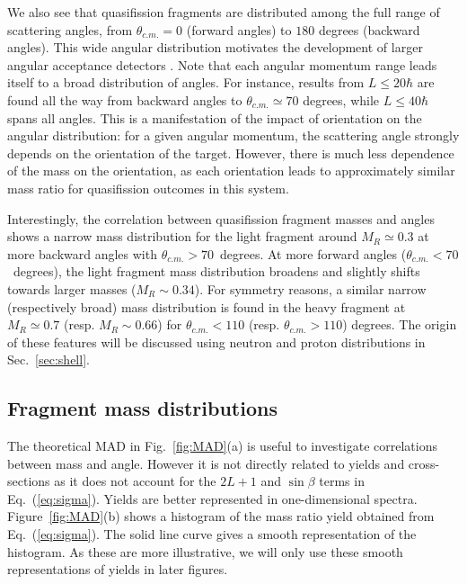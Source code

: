\documentclass[reprint,aps,prc,twocolumn,floatfix,10pt]{revtex4-2}
\begin{document}
We also see that quasifission fragments are distributed among the full range of scattering angles, from $\theta_{c.m.}=0$ (forward angles) to $180$ degrees (backward angles).
This wide angular distribution motivates the development of larger angular acceptance detectors \cite{khuyagbaatar2018,banerjee2019}.
Note that each angular momentum range leads itself to a broad distribution of angles.
For instance, results from $L\le20 \hbar$ are found all the way from backward angles to $\theta_{c.m.}\simeq70$ degrees, while $L\le40 \hbar$ spans all angles.
This is a manifestation of the impact of orientation on the angular distribution: for a given angular momentum, the scattering angle strongly depends on the orientation of the target.
However, there is much less dependence of the mass on the orientation, as each orientation leads to approximately similar mass ratio for quasifission outcomes in this system.

Interestingly, the correlation between quasifission fragment masses and angles shows a narrow mass distribution for the light fragment around $M_R\simeq0.3$ at more backward angles with $\theta_{c.m.}>70$~degrees.
At more forward angles ($\theta_{c.m.}<70$~degrees), the light fragment mass distribution  broadens and slightly shifts towards larger masses ($M_R\sim0.34$).
For symmetry reasons, a similar narrow (respectively broad) mass distribution is found in the heavy fragment at $M_R\simeq0.7$ (resp. $M_R\sim0.66$) for $\theta_{c.m.}<110$ (resp. $\theta_{c.m.}>110$) degrees.
The origin of these features will be discussed using neutron and proton distributions in Sec.~\ref{sec:shell}.

\subsection{Fragment mass distributions}

The theoretical MAD in Fig.~\ref{fig:MAD}(a) is useful to investigate correlations between mass and angle. However it is not directly related to yields and cross-sections as it does not account for the $2L+1$ and $\sin\beta$ terms in Eq.~(\ref{eq:sigma}).
Yields are better represented in one-dimensional spectra.
Figure~\ref{fig:MAD}(b) shows a histogram of the mass ratio yield obtained from Eq.~(\ref{eq:sigma}).
The solid line curve gives a smooth representation of the histogram.
As these are more illustrative, we will only use these smooth representations of yields in later figures.
\end{document}

